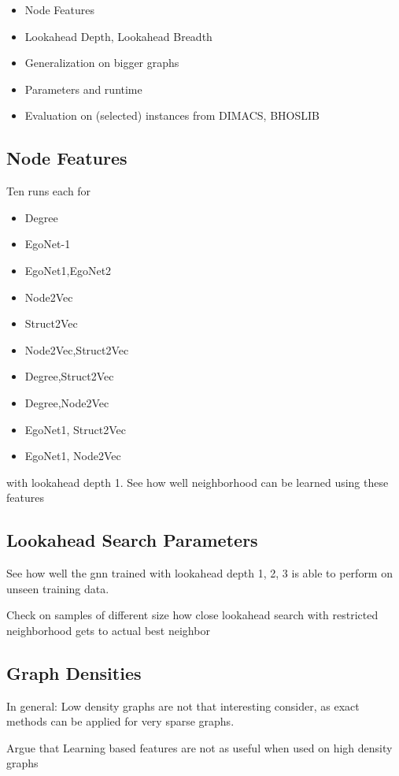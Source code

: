 \documentclass[draft,final]{vutinfth} %
\begin{document}
\begin{itemize}
    \item Node Features
    \item Lookahead Depth, Lookahead Breadth
    \item Generalization on bigger graphs
    \item Parameters and runtime
    \item Evaluation on (selected) instances from DIMACS, BHOSLIB 
\end{itemize}

\subsection{Node Features}

Ten runs each for
\begin{itemize}
    \item Degree
    \item EgoNet-1
    \item EgoNet1,EgoNet2
    \item Node2Vec
    \item Struct2Vec
    \item Node2Vec,Struct2Vec
    \item Degree,Struct2Vec
    \item Degree,Node2Vec
    \item EgoNet1, Struct2Vec
    \item EgoNet1, Node2Vec
\end{itemize}
with lookahead depth 1. See how well neighborhood can be learned using these features

\subsection{Lookahead Search Parameters}
See how well the gnn trained with lookahead depth 1, 2, 3 is able to perform on unseen training data. 

Check on samples of different size how close lookahead search with restricted neighborhood gets to actual best neighbor 

\subsection{Graph Densities}
In general: Low density graphs are not that interesting consider, as exact methods can be applied for very sparse graphs. 

Argue that Learning based features are not as useful when used on high density graphs
\end{document}
